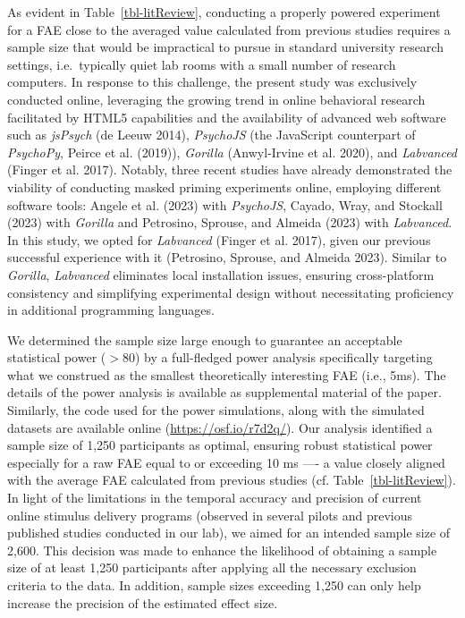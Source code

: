\documentclass[
]{interact}
\begin{document}
As evident in Table~\ref{tbl-litReview}, conducting a properly powered
experiment for a FAE close to the averaged value calculated from
previous studies requires a sample size that would be impractical to
pursue in standard university research settings, i.e.~typically quiet
lab rooms with a small number of research computers. In response to this
challenge, the present study was exclusively conducted online,
leveraging the growing trend in online behavioral research facilitated
by HTML5 capabilities and the availability of advanced web software such
as \emph{jsPsych} (de Leeuw 2014), \emph{PsychoJS} (the JavaScript
counterpart of \emph{PsychoPy}, Peirce et al. (2019)), \emph{Gorilla}
(Anwyl-Irvine et al. 2020), and \emph{Labvanced} (Finger et al. 2017).
Notably, three recent studies have already demonstrated the viability of
conducting masked priming experiments online, employing different
software tools: Angele et al. (2023) with \emph{PsychoJS}, Cayado, Wray,
and Stockall (2023) with \emph{Gorilla} and Petrosino, Sprouse, and
Almeida (2023) with \emph{Labvanced}. In this study, we opted for
\emph{Labvanced} (Finger et al. 2017), given our previous successful
experience with it (Petrosino, Sprouse, and Almeida 2023). Similar to
\emph{Gorilla}, \emph{Labvanced} eliminates local installation issues,
ensuring cross-platform consistency and simplifying experimental design
without necessitating proficiency in additional programming languages.

We determined the sample size large enough to guarantee an acceptable
statistical power (\(>80%
\)) by a full-fledged power analysis specifically targeting what we
construed as the smallest theoretically interesting FAE (i.e., 5ms). The
details of the power analysis is available as supplemental material of
the paper. Similarly, the code used for the power simulations, along
with the simulated datasets are available online
(\url{https://osf.io/r7d2q/}). Our analysis identified a sample size of
1,250 participants as optimal, ensuring robust statistical power
especially for a raw FAE equal to or exceeding 10 ms ---- a value
closely aligned with the average FAE calculated from previous studies
(cf. Table~\ref{tbl-litReview}). In light of the limitations in the
temporal accuracy and precision of current online stimulus delivery
programs (observed in several pilots and previous published studies
conducted in our lab), we aimed for an intended sample size of 2,600.
This decision was made to enhance the likelihood of obtaining a sample
size of at least 1,250 participants after applying all the necessary
exclusion criteria to the data. In addition, sample sizes exceeding
1,250 can only help increase the precision of the estimated effect size.
\end{document}
